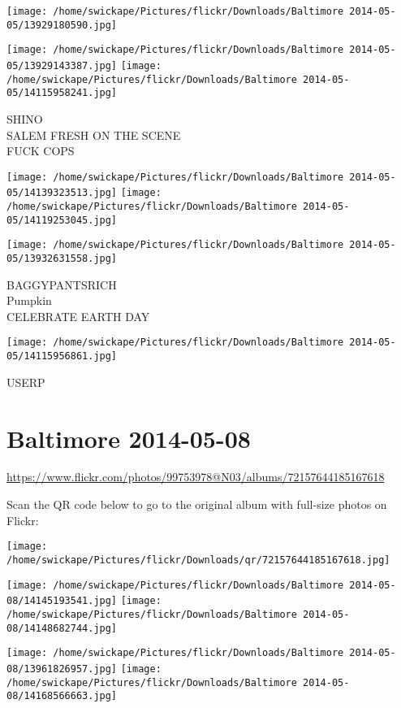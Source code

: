 \documentclass[10pt,letterpaper]{article}
\begin{document}
\texttt{[image: /home/swickape/Pictures/flickr/Downloads/Baltimore 2014-05-05/13929180590.jpg]}

\vspace{0.25in}
\texttt{[image: /home/swickape/Pictures/flickr/Downloads/Baltimore 2014-05-05/13929143387.jpg]}
\texttt{[image: /home/swickape/Pictures/flickr/Downloads/Baltimore 2014-05-05/14115958241.jpg]}

SHINO\\
SALEM FRESH ON THE SCENE\\
FUCK COPS
\pagebreak

\texttt{[image: /home/swickape/Pictures/flickr/Downloads/Baltimore 2014-05-05/14139323513.jpg]}
\texttt{[image: /home/swickape/Pictures/flickr/Downloads/Baltimore 2014-05-05/14119253045.jpg]}

\texttt{[image: /home/swickape/Pictures/flickr/Downloads/Baltimore 2014-05-05/13932631558.jpg]}

BAGGYPANTSRICH\\
Pumpkin\\
CELEBRATE EARTH DAY
\pagebreak

\texttt{[image: /home/swickape/Pictures/flickr/Downloads/Baltimore 2014-05-05/14115956861.jpg]}

USERP
\pagebreak

\section*{Baltimore 2014-05-08}

\url{https://www.flickr.com/photos/99753978@N03/albums/72157644185167618}

Scan the QR code below to go to the original album with full-size photos on Flickr:

\texttt{[image: /home/swickape/Pictures/flickr/Downloads/qr/72157644185167618.jpg]}
\pagebreak

\texttt{[image: /home/swickape/Pictures/flickr/Downloads/Baltimore 2014-05-08/14145193541.jpg]}
\texttt{[image: /home/swickape/Pictures/flickr/Downloads/Baltimore 2014-05-08/14148682744.jpg]}

\texttt{[image: /home/swickape/Pictures/flickr/Downloads/Baltimore 2014-05-08/13961826957.jpg]}
\texttt{[image: /home/swickape/Pictures/flickr/Downloads/Baltimore 2014-05-08/14168566663.jpg]}
\end{document}
